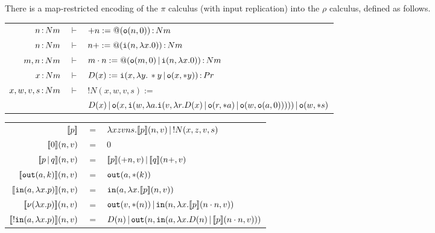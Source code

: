 \documentclass{article}
\begin{document}
\begin{theorem}
    There is a map-restricted encoding of the $\pi$ calculus (with input replication) into the $\rho$ calculus, defined as follows.

    \begin{center}
    \renewcommand{\arraystretch}{1.2}
    \begin{tabular}{rcl}
        $n\,{:}\, Nm$ & $\vdash$ & $+n := @(\mathtt{o}(n,0))\,{:}\, Nm$\\
        $n\,{:}\, Nm$ & $\vdash$ & $n+ := @(\mathtt{i}(n,\lambda x.0))\,{:}\, Nm$\\
        $m,n\,{:}\, Nm$ & $\vdash$ & $m\cdot n := @(\mathtt{o}(m,0)\,|\, \mathtt{i}(n,\lambda x.0))\,{:}\, Nm$\\
        $x\,{:}\, Nm$ & $\vdash$ & $D(x) := \mathtt{i}(x,\lambda y.\, \ast y \,|\, \mathtt{o}(x,\ast y))\,{:}\, Pr$\\
        $x,w,v,s\,{:}\, Nm$ & $\vdash$ & $!N(x,w,v,s) :=$\\
        && $D(x)\,|\, \mathtt{o}(x,\mathtt{i}(w,\lambda a. \mathtt{i}(v, \lambda r. D(x)\,|\, \mathtt{o}(r,\ast a)\,|\, \mathtt{o}(w, \mathtt{o}(a,0)))))\,|\, \mathtt{o}(w,\ast s)$
    \end{tabular}
\end{center}

\begin{center}
    \renewcommand{\arraystretch}{1.2}
    \begin{tabular}{rcl}
         $[\![p]\!]$ & $=$ & $\lambda xzvns. [\![p]\!](n,v)\,|\, !N(x,z,v,s)$\\
         $[\![0]\!](n,v)$ & $=$ & $0$\\
         $[\![p\,|\, q]\!](n,v)$ & $=$ & $[\![p]\!](+n,v)\,|\, [\![q]\!](n+, v)$\\
         $[\![\mathtt{out}(a,k)]\!](n,v)$ & $=$ & $\mathtt{out}(a,\ast(k))$\\
         $[\![\mathtt{in}(a,\lambda x.p)]\!](n,v)$ & $=$ & $\mathtt{in}(a,\lambda x.[\![p]\!](n,v))$\\
         $[\![\nu(\lambda x.p)]\!](n,v)$ & $=$ & $\mathtt{out}(v,\ast(n))\,|\, \mathtt{in}(n,\lambda x.[\![p]\!](n\cdot n,v))$\\
         $[\![!\mathtt{in}(a,\lambda x.p)]\!](n,v)$ & $=$ & $D(n)\,|\, \mathtt{out}(n, \mathtt{in}(a, \lambda x. D(n)\,|\, [\![p]\!](n\cdot n, v)))$
    \end{tabular}
\end{center}
\end{theorem}
\end{document}
